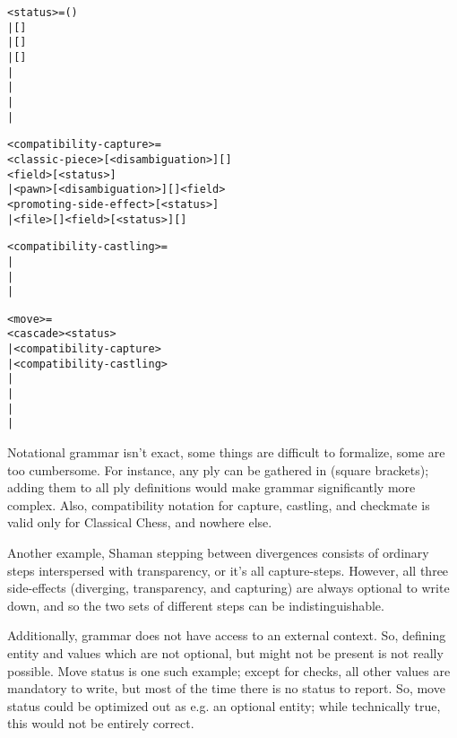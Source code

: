 \begin{alltt}
<status> = ()
         | [\alg{+}]
         | [\alg{+}]\alg{(=)}
         | [\alg{+}]\alg{()}
         | \alg{#}
         | \algcty{++}
         | \alg{(=)}
         | \alg{()}

<compatibility-capture> =
  <classic-piece>[<disambiguation>][]
    <field>[<status>]
| <pawn>[<disambiguation>][]<field>
    <promoting-side-effect>[<status>]
| <file>[]<field>[<status>][]

<compatibility-castling> =
| 
| 
| 

<move> =
  <cascade><status>
| <compatibility-capture>
| <compatibility-castling>
| \alg{#}
| \alg{##}
| \alg{(==)}
| \alg{(===)}
\end{alltt}

\clearpage %

Notational grammar isn't exact, some things are difficult to formalize, some
are too cumbersome. For instance, any ply can be gathered in \alg{[ ]} (square
brackets); adding them to all ply definitions would make grammar significantly
more complex. Also, compatibility notation for capture, castling, and checkmate
is valid only for Classical Chess, and nowhere else.

Another example, Shaman stepping between divergences consists of ordinary steps
interspersed with transparency, or it's all capture-steps. However, all three
side-effects (diverging, transparency, and capturing) are always optional to
write down, and so the two sets of different steps can be indistinguishable.

Additionally, grammar does not have access to an external context. So, defining
entity and values which are not optional, but might not be present is not really
possible. Move status is one such example; except for checks, all other values
are mandatory to write, but most of the time there is no status to report. So,
move status could be optimized out as e.g. an optional entity; while technically
true, this would not be entirely correct.

\clearpage %
